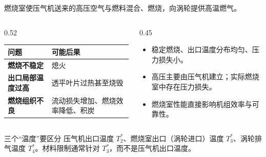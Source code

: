\begin{frame}[t,shrink]{}
燃烧室使压气机送来的高压空气与燃料混合、燃烧，向涡轮提供高温燃气。
\begin{columns}[T,onlytextwidth]
\begin{column}{0.52\textwidth}
  \begin{smalltab}
  \begin{tabularx}{\linewidth}{@{}>{\bfseries}p{37mm}X@{}}
    \toprule
    问题 & 可能后果\\
    \midrule
    燃烧不稳定 & 熄火\\
    出口局部温度过高 & 透平叶片过热甚至烧毁\\
    燃烧组织不良 & 流动损失增加、燃烧效率降低、积炭\\
    \bottomrule
  \end{tabularx}
  \end{smalltab}
\end{column}
\begin{column}{0.45\textwidth}
  \begin{itemize}
    \item 稳定燃烧、出口温度分布均匀、压力损失小。
    \item 高压主要由压气机建立；实际燃烧室中存在压力损失。
    \item 燃烧室性能直接影响机组效率与可靠性。
  \end{itemize}
\end{column}
\end{columns}
\vspace{0.8mm}
\begin{keybox}{三个“温度”要区分}
\small 压气机出口温度 \(T_2^*\)、燃烧室出口（涡轮进口）温度 \(T_3^*\)、涡轮排气温度 \(T_4^*\)。材料限制通常针对 \(T_3^*\)，而不是压气机出口温度。
\end{keybox}
\end{frame}

